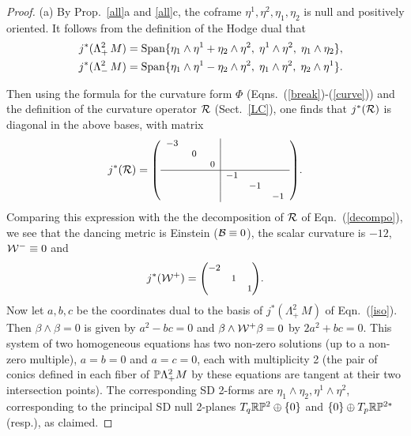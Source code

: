 \begin{proof}

\mn (a)   By Prop.~\ref{all}a and \ref{all}c, the coframe $\eta^1, \eta^2,\eta_1, \eta_2$ is null and positively oriented. It follows from the definition of the Hodge dual  that
%
%
\begin{subequations}
\begin{align}\label{iso}
\quad j^*( \Lambda^2_+\,M)&= 
\Span\{ \eta_1\wedge\eta^1+\eta_2\wedge\eta^2, \;
\eta^1\wedge\eta^2, \; 
\eta_1\wedge\eta_2
\},\\
\quad j^*( \Lambda^2_-\,M)&= 
\Span\{ \eta_1\wedge\eta^1-\eta_2\wedge\eta^2, \;
\eta_1\wedge\eta^2, \; 
\eta_2\wedge\eta^1
\}.
\end{align}
\end{subequations}



Then using  the formula for the curvature form $\Phi$ (Eqns.~(\ref{break})-(\ref{curve})) and the definition of the curvature operator  $\cR$
(Sect.~\ref{LC}), one finds that $j^*(\cR)$ is diagonal in the above bases,  with matrix 
$$
j^*(\cR)={\footnotesize\left(\begin{array}{ccc|ccc}
-3&&&&&\\ 
&\;0&&&&\\ 
&&\;0&&&\\
\hline
&&&-1&&\\ 
&&&&-1&\\ &&&&&-1
\end{array}\right)}.
$$ 
Comparing this expression with the the decomposition of $\cR$ of Eqn.~(\ref{decompo}), we see that the dancing metric is Einstein ($\cB\equiv 0$), the scalar curvature is  $-12$,  $\cW^-\equiv 0$ and 
$$j^*(\cW^+)={\footnotesize\left(
\begin{matrix}-2&&\\ &1&\\ &&1\end{matrix}\right)}.
$$
Now let  $a,b,c$  be the  coordinates dual to the basis of  $ j^*( \Lambda^2_+\,M)$  of Eqn.~(\ref{iso}). Then $\beta\wedge\beta=0$
 is given by $a^2-bc=0$ and $\beta\wedge\cW^+\beta=0$  by $2a^2+bc=0$. This system of  two homogeneous equations has two non-zero
  solutions (up to a non-zero multiple), $a=b=0$ and $a=c=0$, each with multiplicity 2 (the  pair of conics defined in
  each fiber of $\P\Lambda^2_+M$ by these equations are tangent at their two  intersection points). 
  The corresponding SD  2-forms are $\eta_1\wedge\eta_2, \eta^1\wedge\eta^2$,  corresponding  
  to the principal SD null 2-planes  $T_q\RPt\oplus \{0\}$ and $\{0\}\oplus T_p\RPts $ (resp.), as claimed. 


\end{proof}
